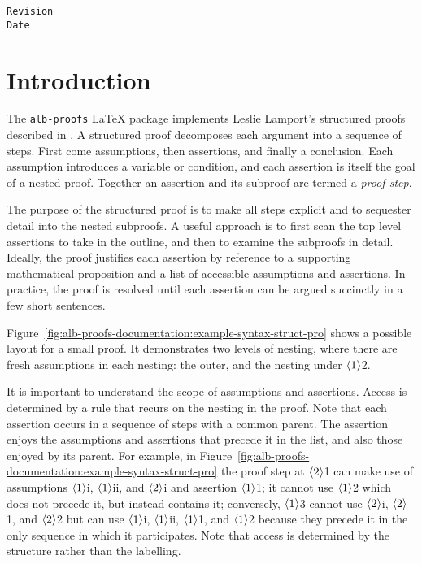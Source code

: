 \documentclass[11pt,a4paper,oneside,titlepage]{alb-latex}
\begin{document}
\begin{albTitlePage}

  \verb$Revision$\\
  \verb$Date$

\end{albTitlePage}




\section{Introduction}
\label{sec:alb-proofs-examples:intr}

The \texttt{alb-proofs} \LaTeX{} package implements Leslie Lamport's
structured proofs described in \citep{lamport93:_how_write_proof}.  A
structured proof decomposes each argument into a sequence of steps.
First come assumptions, then assertions, and finally a conclusion.  Each
assumption introduces a variable or condition, and each assertion is
itself the goal of a nested proof.  Together an assertion and its
subproof are termed a \emph{proof step}.

The purpose of the structured proof is to make all steps explicit and to
sequester detail into the nested subproofs.  A useful approach is to
first scan the top level assertions to take in the outline, and then to
examine the subproofs in detail.  Ideally, the proof justifies each
assertion by reference to a supporting mathematical proposition and a
list of accessible assumptions and assertions.  In practice, the proof
is resolved until each assertion can be argued succinctly in a few short
sentences.

Figure~\ref{fig:alb-proofs-documentation:example-syntax-struct-pro}
shows a possible layout for a small proof.  It demonstrates two levels
of nesting, where there are fresh assumptions in each nesting: the
outer, and the nesting under $\albTuple{1}$2.

It is important to understand the scope of assumptions and assertions.
Access is determined by a rule that recurs on the nesting in the proof.
Note that each assertion occurs in a sequence of steps with a common
parent.  The assertion enjoys the assumptions and assertions that
precede it in the list, and also those enjoyed by its parent.  For
example, in
Figure~\ref{fig:alb-proofs-documentation:example-syntax-struct-pro} the
proof step at $\albTuple{2}$1 can make use of assumptions
$\albTuple{1}$i, $\albTuple{1}$ii, and $\albTuple{2}$i and assertion
$\albTuple{1}$1; it cannot use $\albTuple{1}$2 which does not precede
it, but instead contains it; conversely, $\albTuple{1}$3 cannot use
$\albTuple{2}$i, $\albTuple{2}$1, and $\albTuple{2}$2 but can use
$\albTuple{1}$i, $\albTuple{1}$ii, $\albTuple{1}$1, and $\albTuple{1}$2
because they precede it in the only sequence in which it participates.
Note that access is determined by the structure rather than the
labelling.
\end{document}
